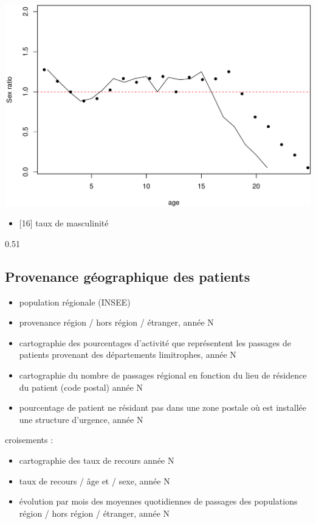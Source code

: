 \documentclass[]{article}
\begin{document}
\includegraphics{rapport_2014_files/figure-latex/ratio_classe_age-1.pdf}

\begin{itemize}
\itemsep1pt\parskip0pt
\item
  {[}16{]} taux de masculinité
\end{itemize}

0.51

\subsection{Provenance géographique des
patients}\label{provenance-geographique-des-patients}

\begin{itemize}
\item
  population régionale (INSEE)
\item
  provenance région / hors région / étranger, année N
\item
  cartographie des pourcentages d'activité que représentent les passages
  de patients provenant des départements limitrophes, année N
\item
  cartographie du nombre de passages régional en fonction du lieu de
  résidence du patient (code postal) année N
\item
  pourcentage de patient ne résidant pas dans une zone postale où est
  installée une structure d'urgence, année N
\end{itemize}

croisements :

\begin{itemize}
\itemsep1pt\parskip0pt
\item
  cartographie des taux de recours année N
\item
  taux de recours / âge et / sexe, année N
\item
  évolution par mois des moyennes quotidiennes de passages des
  populations région / hors région / étranger, année N
\end{itemize}
\end{document}
